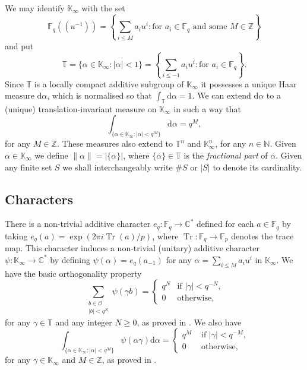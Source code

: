 \documentclass[12pt, reqno]{amsart}
\numberwithin{equation}{section}
\renewcommand{\d}{\mathrm{d}}
\newcommand{\0}{\mathbf{0}}
\newcommand{\FF}{\mathbb{F}}
\newcommand{\ZZ}{\mathbb{Z}}
\newcommand{\NN}{\mathbb{N}}
\newcommand{\CC}{\mathbb{C}}
\newcommand{\TT}{\mathbb{T}}
\newcommand{\KK}{\mathbb{K}}
\newcommand{\cO}{\mathcal{O}}
\DeclareMathOperator{\tr}{Tr}
\renewcommand{\leq}{\leqslant}
\renewcommand{\geq}{\geqslant}
\renewcommand{\=}{\equiv}
\newcommand{\1}{\mathbf{1}}
\theoremstyle{definition}
\begin{document}
We may identify $\KK_\infty$ with the set
$$
\FF_q((u^{-1}))=\left\{\sum_{i\leq M}a_i u^i: \text{for $a_i\in \FF_q$ and some $M \in\ZZ$} \right\}
$$
and put
$$
\TT=\{\alpha\in \KK_\infty: |\alpha|<1\}=\left\{\sum_{i\leq -1}a_i u^i: \text{for $a_i\in \FF_q$}
\right\}.
$$
Since $\TT$ is a locally compact
additive subgroup of $\KK_\infty$ it possesses a unique Haar measure $\d
\alpha$, which is normalised so that
$
\int_\TT \d \alpha=1.
$
We can extend $\d\alpha$ to a (unique) translation-invariant measure on $\KK_\infty$ in
such a way that
$$
\int_{\{\alpha\in \KK_\infty :
|\alpha|< q^M
\}} \d \alpha= q^M,
$$
for any $M \in \ZZ$.
These measures also extend to $\TT^n$ and $\KK_\infty^n$, for any $n\in \NN$.
Given $\alpha \in \KK_\infty$ we define $\| \alpha  \| = |\{ \alpha \}|$, where $\{\alpha\} \in \TT$ is the {\em fractional part} of $\alpha$.
Given any finite set $S$ we shall interchangeably write $\#S$ or $|S|$ to denote its cardinality.


\subsection*{Characters}
There is a non-trivial additive character $e_q:\FF_q\rightarrow \CC^*$ defined
for each $a\in \FF_q$ by taking
$e_q(a)=\exp(2\pi i \tr(a)/p)$, where $\tr: \FF_q\rightarrow \FF_p$ denotes the
trace map.
This character induces a non-trivial (unitary) additive character $\psi:
\KK_\infty\rightarrow \CC^*$ by defining $\psi(\alpha)=e_q(a_{-1})$ for any
$\alpha=\sum_{i\leq M}a_i u^i$ in $\KK_\infty$.
We have the  basic orthogonality property
\begin{equation}\label{eq:laurel}
\sum_{\substack{b\in \cO\\ |b|< q^N}}\psi(\gamma b)=\begin{cases}
q^N & \text{if $|\gamma|< q^{-N}$,}\\
0 & \text{otherwise},
\end{cases}
\end{equation}
for any $\gamma \in \TT$ and any integer $N\geq 0$, as proved in  \cite[Lemma 7]{kubota}.
We also have
\begin{equation}\label{eq:ortho}
\int_{\{\alpha\in \KK_\infty: |\alpha|<q^M\}} \psi(\alpha \gamma) \d \alpha =\begin{cases}
q^M &\text{ if $|\gamma|<q^{-M}$,}\\
0 &\text{ otherwise,}
\end{cases}
\end{equation}
for any $\gamma\in \KK_\infty$ and $M \in \ZZ$, as proved in \cite[Lemma 1(f)]{kubota}.
\end{document}
